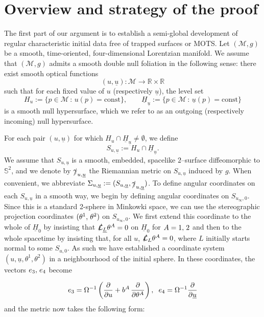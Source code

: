 \documentclass{amsart}
\newcommand{\Lbar}{\underline{L}}
\newcommand{\Hbar}{\underline{H}}
\newcommand{\hsp}{\hspace{.5mm}}
\newcommand{\ubar}{\underline{u}}
\begin{document}
\noindent \section{Overview and strategy of the proof}


\noindent The first part of our argument is to establish a semi-global development of regular characteristic initial data free of trapped surfaces or MOTS. Let $(\mathcal{M},g)$ be a smooth, time-oriented, four-dimensional Lorentzian manifold. 
We assume that $(\mathcal{M},g)$ admits a smooth double null foliation in the following sense: 
there exist smooth optical functions
\[
(u,\ubar) : \mathcal{M} \to \mathbb{R} \times \mathbb{R}
\]
such that for each fixed value of $u$ (respectively $\ubar$), the level set
\[
H_u := \{ p \in \mathcal{M} \,:\, u(p)=\mathrm{const} \},
\qquad
\Hbar_{\ubar} := \{ p \in \mathcal{M} \,:\, \ubar(p)=\mathrm{const} \}
\]
is a smooth null hypersurface, which we refer to as an outgoing (respectively incoming) null hypersurface.

\noindent For each pair $(u,\ubar)$ for which $H_u \cap \Hbar_{\ubar} \neq \emptyset$, we define
\[
S_{u,\ubar} := H_u \cap \Hbar_{\ubar}.
\]
We assume that $S_{u,\ubar}$ is a smooth, embedded, spacelike $2$--surface diffeomorphic to $\mathbb{S}^2$, 
and we denote by $\slashed{\gamma}_{u,\ubar}$ the Riemannian metric on $S_{u,\ubar}$ induced by $g$. 
When convenient, we abbreviate $\Sigma_{u,\ubar}:=(S_{u,\ubar},\slashed{\gamma}_{u,\ubar})$. To define angular coordinates on each $S_{u,\ubar}$ in a smooth way, we begin by defining angular coordinates	on $S_{u_{\infty},0}$. Since this is a standard 2-sphere in Minkowki space, we can use the stereographic projection coordinates $(\theta^1, \hsp \theta^2)$ on $S_{u_{\infty},0}$. We first extend this coordinate to the whole of $\Hbar_0$ by insisting that $\slashed{\mathcal{L}}_{\Lbar}\theta^A = 0$ on $\Hbar_0$ for $A=1, \hsp 2$ and then to the whole spacetime by insisting that, for all $u$, $\slashed{\mathcal{L}}_L \theta^A =0$, where $L$ initially starts normal to some $S_{u,0}$. As such we have established a coordinate system $(u,\ubar, \theta^1, \theta^2)$ in a neighbourhood of the initial sphere. In these coordinates, the vectors $e_3, \hsp e_4$ become


\[e_3 = \Omega^{-1}\left( \frac{\partial}{\partial u} + b^A \hsp \frac{\partial}{\partial \theta^A}\right), \hspace{2mm} e_4 = \Omega^{-1} \frac{\partial}{\partial \ubar} \] and the metric now takes the following form:
\end{document}
